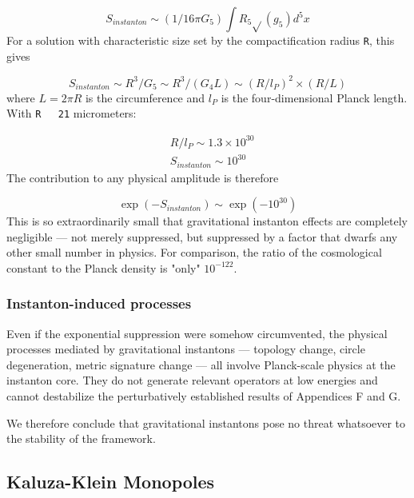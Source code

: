 \documentclass[aps,prd,preprint,superscriptaddress,longbibliography,floatfix]{revtex4-2}
\theoremstyle{remark}
\begin{document}
\begin{equation}
    S_{instanton} \sim  (1 / 16\pi G_{5}) \int R_{5} \sqrt{}(g_{5}) d^{5}x
\end{equation}
For a solution with characteristic size set by the compactification radius \texttt{R}, this gives


\begin{equation}
    S_{instanton} \sim  R^{3} / G_{5} \sim  R^{3} / (G_{4} L) \sim  (R / l_P)^{2} \times (R / L)
\end{equation}
where $L = 2\pi R$ is the circumference and $l_P$ is the four-dimensional Planck length. With \texttt{R ~ 21} micrometers:


\begin{align}
    & R / l_P \sim  1.3 \times 10^{30} \\
    & S_{instanton} \sim  10^{30}
\end{align}
The contribution to any physical amplitude is therefore


\begin{equation}
    \exp(-S_{instanton}) \sim  \exp(-10^{30})
\end{equation}
This is so extraordinarily small that gravitational instanton effects are completely negligible --- not merely suppressed, but suppressed by a factor that dwarfs any other small number in physics. For comparison, the ratio of the cosmological constant to the Planck density is "only" $10^{-122}$.


\subsubsection{Instanton-induced processes}

Even if the exponential suppression were somehow circumvented, the physical processes mediated by gravitational instantons --- topology change, circle degeneration, metric signature change --- all involve Planck-scale physics at the instanton core. They do not generate relevant operators at low energies and cannot destabilize the perturbatively established results of Appendices F and G.

We therefore conclude that gravitational instantons pose no threat whatsoever to the stability of the framework.



\subsection{Kaluza-Klein Monopoles}
\end{document}

